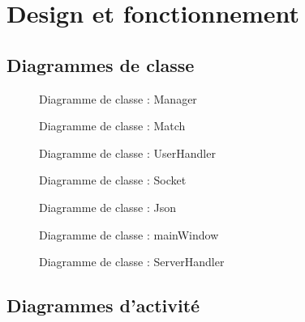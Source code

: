 \documentclass[a4paper]{report}
\begin{document}
\section{Design et fonctionnement}
\subsection{Diagrammes de classe}

\begin{figure}[H]
    \caption{Diagramme de classe : Manager}
\end{figure}

\begin{figure}[H]
    \caption{Diagramme de classe : Match}
\end{figure}

\begin{figure}[H]
    \caption{Diagramme de classe : UserHandler}
\end{figure}

\begin{figure}[H]
    \caption{Diagramme de classe : Socket}
\end{figure}

\begin{figure}[H]
    \caption{Diagramme de classe : Json}
\end{figure}

\begin{figure}[H]
    \caption{Diagramme de classe : mainWindow}
\end{figure}

\begin{figure}[H]
    \caption{Diagramme de classe : ServerHandler}
\end{figure}



\subsection{Diagrammes d'activité}
\end{document}
